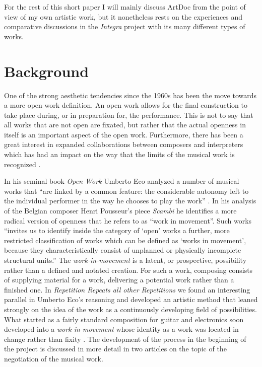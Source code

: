 \documentclass[,a4paper]{llncs}
\begin{document}
For the rest of this short paper I will mainly discuss ArtDoc from the point of view of my own artistic work, but it nonetheless rests on the experiences and comparative discussions in the \emph{Integra} project with its many different types of works.

\section{Background}
\label{sec:background}

One of the strong aesthetic tendencies since the 1960s has been the move towards a more open work definition. An open work allows for the final construction to take place during, or in preparation for, the performance. This is not to say that all works that are not open are fixated, but rather that the actual openness in itself is an important aspect of the open work. Furthermore, there has been a great interest in expanded collaborations between composers and interpreters which has had an impact on the way that the limits of the musical work is recognized \cite{ostersjo08}. 

In his seminal book \emph{Open Work} Umberto Eco analyzed a number of musical works that ``are linked by a common feature: the considerable autonomy left to the individual performer in the way he chooses to play the work'' \cite{eco68}. In his analysis of the Belgian composer Henri Pousseur's piece \emph{Scambi} he identifies a more radical version of openness that he refers to as ``work in movement''. Such works ``invites us to identify inside the category of `open' works a further, more restricted classification of works which can be defined as `works in movement', because they characteristically consist of unplanned or physically incomplete structural units.'' \cite{eco68} The \emph{work-in-movement} is a latent, or prospective, possibility rather than a defined and notated creation. For such a work, composing consists of supplying material for a work, delivering a potential work rather than a finished one. In \emph{Repetition Repeats all other Repetitions} we found an interesting parallel in Umberto Eco's reasoning and developed an artistic method that leaned strongly on the idea of the work as a continuously developing field of possibilities. What started as a fairly standard composition for guitar and electronics soon developed into a \emph{work-in-movement} whose identity as a work was located in change rather than fixity \cite{eco68,frisk08}. The development of the process in the beginning of the project is discussed in more detail in two articles on the topic of the negotiation of the musical work. \cite{frisk-ost06,frisk-ost06-2}
\end{document}

